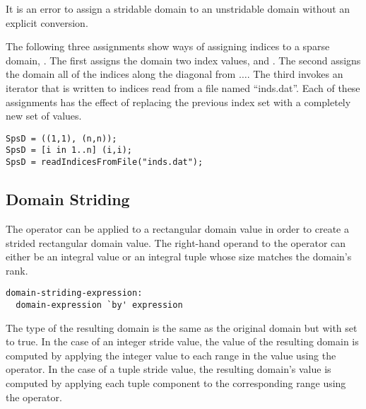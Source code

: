 It is an error to assign a stridable domain to an unstridable domain
without an explicit conversion.

\begin{example}
The following three assignments show ways of assigning indices to a
sparse domain, .  The first assigns the domain two index
values,  and .  The second assigns the domain
all of the indices along the diagonal from
$\ldots$.  The third invokes an iterator that
is written to  indices read from a file named
``inds.dat''.  Each of these assignments has the effect of replacing
the previous index set with a completely new set of values.
\begin{chapel}
\begin{verbatim}
SpsD = ((1,1), (n,n));
SpsD = [i in 1..n] (i,i);
SpsD = readIndicesFromFile("inds.dat");
\end{verbatim}
\end{chapel}
\end{example}

\subsection{Domain Striding}
\label{Domain_Striding}

The  operator can be applied to a rectangular domain value in
order to create a strided rectangular domain value.  The right-hand
operand to the  operator can either be an integral value or
an integral tuple whose size matches the domain's rank.

\begin{syntax}
\begin{verbatim}
domain-striding-expression:
  domain-expression `by' expression
\end{verbatim}
\end{syntax}

The type of the resulting domain is the same as the original domain
but with  set to true.  In the case of an integer
stride value, the value of the resulting domain is computed by
applying the integer value to each range in the value using the
 operator.  In the case of a tuple stride value, the resulting
domain's value is computed by applying each tuple component to the
corresponding range using the  operator.


